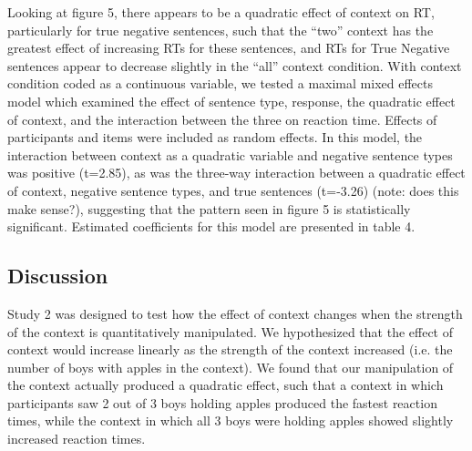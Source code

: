 \documentclass[man]{apa2}
\begin{document}
Looking at figure 5, there appears to be a quadratic effect of context on RT, particularly for true negative sentences, such that the ``two'' context has the greatest effect of increasing RTs for these sentences, and RTs for True Negative sentences appear to decrease slightly in the ``all'' context condition.  With context condition coded as a continuous variable, we tested a maximal mixed effects model which examined the effect of sentence type, response, the quadratic effect of context, and the interaction between the three on reaction time.  Effects of participants and items were included as random effects.  In this model, the interaction between context as a quadratic variable and negative sentence types was positive (t=2.85), as was the three-way interaction between a quadratic effect of context, negative sentence types, and true sentences (t=-3.26) (note: does this make sense?), suggesting that the pattern seen in figure 5 is statistically significant.  Estimated coefficients for this model are presented in table 4.  

\subsection{Discussion}
Study 2 was designed to test how the effect of context changes when the strength of the context is quantitatively manipulated.  We hypothesized that the effect of context would increase linearly as the strength of the context increased (i.e. the number of boys with apples in the context).  We found that our manipulation of the context actually produced a quadratic effect, such that a context in which participants saw 2 out of 3 boys holding apples produced the fastest reaction times, while the context in which all 3 boys were holding apples showed slightly increased reaction times.  
\end{document}
